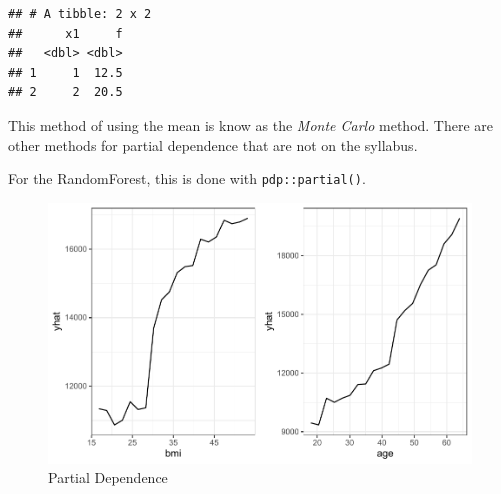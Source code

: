 \documentclass[openany]{book}
\newenvironment{Shaded}{\begin{snugshade}}{\end{snugshade}}
\newcommand{\DataTypeTok}[1]{\textcolor[rgb]{0.13,0.29,0.53}{#1}}
\newcommand{\DecValTok}[1]{\textcolor[rgb]{0.00,0.00,0.81}{#1}}
\newcommand{\KeywordTok}[1]{\textcolor[rgb]{0.13,0.29,0.53}{\textbf{#1}}}
\newcommand{\NormalTok}[1]{#1}
\newcommand{\OperatorTok}[1]{\textcolor[rgb]{0.81,0.36,0.00}{\textbf{#1}}}
\newcommand{\StringTok}[1]{\textcolor[rgb]{0.31,0.60,0.02}{#1}}
\begin{document}
\begin{verbatim}
## # A tibble: 2 x 2
##      x1     f
##   <dbl> <dbl>
## 1     1  12.5
## 2     2  20.5
\end{verbatim}

This method of using the mean is know as the \emph{Monte Carlo} method. There are other methods for partial dependence that are not on the syllabus.

For the RandomForest, this is done with \texttt{pdp::partial()}.

\begin{Shaded}
\end{Shaded}

\begin{figure}
\centering
\includegraphics{06-tree-based-models_files/figure-latex/unnamed-chunk-19-1.pdf}
\caption{\label{fig:unnamed-chunk-19}Partial Dependence}
\end{figure}
\end{document}
